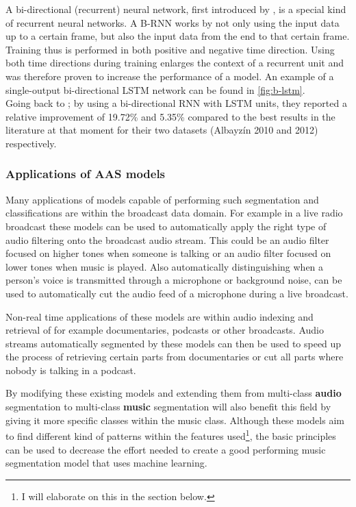 A bi-directional (recurrent) neural network, first introduced by \textcite{Schuster1997bidirectional}, is a special kind of recurrent neural networks. A B-RNN works by not only using the input data up to a certain frame, but also the input data from the end to that certain frame. Training thus is performed in both positive and negative time direction. Using both time directions during training enlarges the context of a recurrent unit and was therefore proven to increase the performance of a model. An example of a single-output bi-directional LSTM network can be found in \autoref{fig:b-lstm}.\\

Going back to \citeauthor{Gimeno2020a}; by using a bi-directional RNN with LSTM units, they reported a relative improvement of 19.72\% and 5.35\% compared to the best results in the literature at that moment for their two datasets (Albayzín 2010 and 2012) respectively. 

\subsubsection{Applications of AAS models}
Many applications of models capable of performing such segmentation and classifications are within the broadcast data domain. For example in a live radio broadcast these models can be used to automatically apply the right type of audio filtering onto the broadcast audio stream. This could be an audio filter focused on higher tones when someone is talking or an audio filter focused on lower tones when music is played. Also automatically distinguishing when a person's voice is transmitted through a microphone or background noise, can be used to automatically cut the audio feed of a microphone during a live broadcast.

Non-real time applications of these models are within audio indexing and retrieval of for example documentaries, podcasts or other broadcasts. Audio streams automatically segmented by these models can then be used to speed up the process of retrieving certain parts from documentaries or cut all parts where nobody is talking in a podcast.

By modifying these existing models and extending them from multi-class \textbf{audio} segmentation to multi-class \textbf{music} segmentation will also benefit this field by giving it more specific classes within the music class. Although these models aim to find different kind of patterns within the features used\footnote{I will elaborate on this in the  section below.}, the basic principles can be used to decrease the effort needed to create a good performing music segmentation model that uses machine learning.



